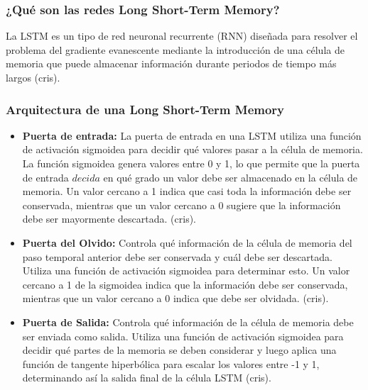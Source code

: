 \subsubsection{¿Qué son las redes Long Short-Term Memory?}

La LSTM es un tipo de red neuronal recurrente (RNN) diseñada para resolver el problema del gradiente evanescente mediante la introducción de una célula de memoria que puede almacenar información durante periodos de tiempo más largos (cris).

\subsubsection{Arquitectura de una Long Short-Term Memory}

\begin{itemize}
    \item \textbf{Puerta de entrada:} La puerta de entrada en una LSTM utiliza una función de activación sigmoidea para decidir qué valores pasar a la célula de memoria. La función sigmoidea genera valores entre 0 y 1, lo que permite que la puerta de entrada \( decida \) en qué grado un valor debe ser almacenado en la célula de memoria. Un valor cercano a 1 indica que casi toda la información debe ser conservada, mientras que un valor cercano a 0 sugiere que la información debe ser mayormente descartada. (cris).
\end{itemize}

\begin{itemize}
    \item \textbf{Puerta del Olvido:} Controla qué información de la célula de memoria del paso temporal anterior debe ser conservada y cuál debe ser descartada. Utiliza una función de activación sigmoidea para determinar esto. Un valor cercano a 1 de la sigmoidea indica que la información debe ser conservada, mientras que un valor cercano a 0 indica que debe ser olvidada. (cris).
\end{itemize}

\begin{itemize}
    \item \textbf{Puerta de Salida:} Controla qué información de la célula de memoria debe ser enviada como salida. Utiliza una función de activación sigmoidea para decidir qué partes de la memoria se deben considerar y luego aplica una función de tangente hiperbólica para escalar los valores entre -1 y 1, determinando así la salida final de la célula LSTM (cris).
\end{itemize}

